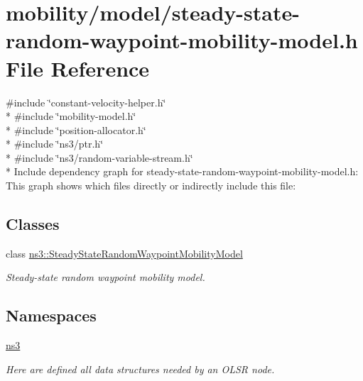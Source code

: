 \hypertarget{steady-state-random-waypoint-mobility-model_8h}{}\section{mobility/model/steady-\/state-\/random-\/waypoint-\/mobility-\/model.h File Reference}
\label{steady-state-random-waypoint-mobility-model_8h}
{\ttfamily \#include \char`\"{}constant-\/velocity-\/helper.\+h\char`\"{}}\\*
{\ttfamily \#include \char`\"{}mobility-\/model.\+h\char`\"{}}\\*
{\ttfamily \#include \char`\"{}position-\/allocator.\+h\char`\"{}}\\*
{\ttfamily \#include \char`\"{}ns3/ptr.\+h\char`\"{}}\\*
{\ttfamily \#include \char`\"{}ns3/random-\/variable-\/stream.\+h\char`\"{}}\\*
Include dependency graph for steady-\/state-\/random-\/waypoint-\/mobility-\/model.h\+:
This graph shows which files directly or indirectly include this file\+:
\subsection*{Classes}
\begin{DoxyCompactItemize}
\item 
class \hyperlink{classns3_1_1SteadyStateRandomWaypointMobilityModel}{ns3\+::\+Steady\+State\+Random\+Waypoint\+Mobility\+Model}
\begin{DoxyCompactList}\small\item\em Steady-\/state random waypoint mobility model. \end{DoxyCompactList}\end{DoxyCompactItemize}
\subsection*{Namespaces}
\begin{DoxyCompactItemize}
\item 
 \hyperlink{namespacens3}{ns3}
\begin{DoxyCompactList}\small\item\em Here are defined all data structures needed by an O\+L\+SR node. \end{DoxyCompactList}\end{DoxyCompactItemize}
